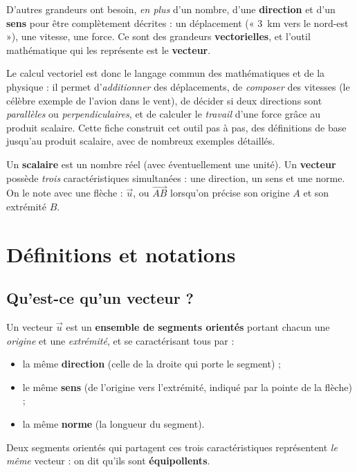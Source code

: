 \documentclass[11pt,a4paper]{article}
\newcommand{\vc}[1]{\overrightarrow{#1}}        %
\begin{document}
D'autres grandeurs ont besoin, \emph{en plus} d'un nombre, d'une \textbf{direction} et d'un \textbf{sens}
pour être complètement décrites : un déplacement (« \SI{3}{\km} vers le nord-est »), une vitesse, une force.
Ce sont des grandeurs \textbf{vectorielles}, et l'outil mathématique qui les représente est le \textbf{vecteur}.

Le calcul vectoriel est donc le langage commun des mathématiques et de la physique : il permet
d'\emph{additionner} des déplacements, de \emph{composer} des vitesses (le célèbre exemple de l'avion
dans le vent), de décider si deux directions sont \emph{parallèles} ou \emph{perpendiculaires}, et de
calculer le \emph{travail} d'une force grâce au produit scalaire. Cette fiche construit cet outil pas à pas,
des définitions de base jusqu'au produit scalaire, avec de nombreux exemples détaillés.

\begin{remarque}
Un \textbf{scalaire} est un nombre réel (avec éventuellement une unité). Un \textbf{vecteur} possède
\emph{trois} caractéristiques simultanées : une direction, un sens et une norme. On le note avec une
flèche : $\vec{u}$, ou $\vc{AB}$ lorsqu'on précise son origine $A$ et son extrémité $B$.
\end{remarque}

\section{Définitions et notations}

\subsection{Qu'est-ce qu'un vecteur ?}

\begin{definition}[vecteur]
Un vecteur $\vec{u}$ est un \textbf{ensemble de segments orientés} portant chacun une \emph{origine}
et une \emph{extrémité}, et se caractérisant tous par :
\begin{itemize}[leftmargin=1.6em,topsep=2pt,itemsep=1pt]
  \item la même \textbf{direction} (celle de la droite qui porte le segment) ;
  \item le même \textbf{sens} (de l'origine vers l'extrémité, indiqué par la pointe de la flèche) ;
  \item la même \textbf{norme} (la longueur du segment).
\end{itemize}
Deux segments orientés qui partagent ces trois caractéristiques représentent \emph{le même} vecteur :
on dit qu'ils sont \textbf{équipollents}.
\end{definition}
\end{document}
